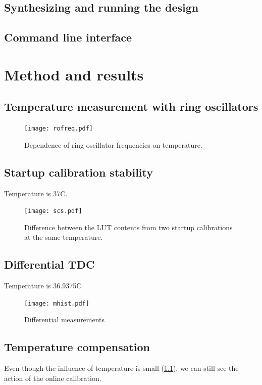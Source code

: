 \documentclass[a4paper,11pt]{article}
\begin{document}
\subsection{Synthesizing and running the design}

\subsection{Command line interface}

\section{Method and results}

\subsection{Temperature measurement with ring oscillators}
\label{sec:rofreq}

\begin{figure}[!h]
\texttt{[image: rofreq.pdf]}
\caption{Dependence of ring oscillator frequencies on temperature.}
\label{fig:rofreq}
\end{figure}

\subsection{Startup calibration stability}
Temperature is 37C.

\begin{figure}[!h]
\texttt{[image: scs.pdf]}
\caption{Difference between the LUT contents from two startup calibrations at the same temperature.}
\label{fig:scs}
\end{figure}

\subsection{Differential TDC}

Temperature is 36.9375\degree C
\begin{figure}[!h]
\texttt{[image: mhist.pdf]}
\caption{Differential measurements}
\label{fig:mhistll}
\end{figure}

\subsection{Temperature compensation}
Even though the influence of temperature is small (\ref{sec:rofreq}), we can still see the action of the online calibration.
\end{document}
